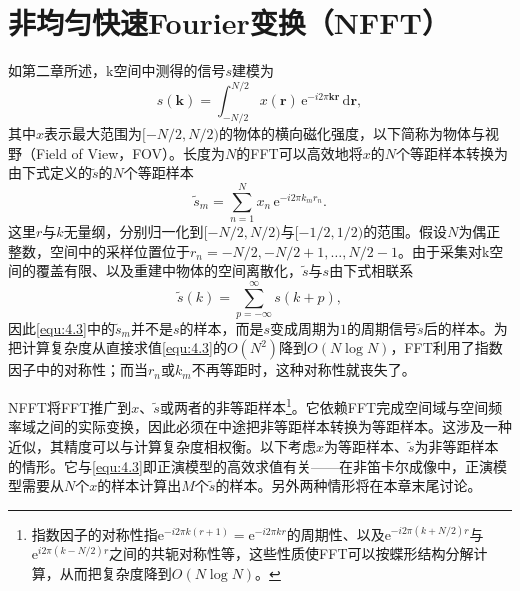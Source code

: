 \documentclass[12pt]{article}
\let\originallautoref\autoref
\renewcommand{\autoref}[1]{\allowbreak\originallautoref{#1}}
\begin{document}
\section{非均匀快速Fourier变换（NFFT）}
如第二章所述，k空间中测得的信号$s$建模为
\begin{equation}
    s(\bm{k})=\int_{-N/2}^{N/2}x(\bm{r})\,\mathrm{e}^{-i2\pi\bm{k}\bm{r}}\,\mathrm{d}\bm{r},
    \label{equ:4.2}
\end{equation}
其中$x$表示最大范围为$[-N/2,N/2)$的物体的横向磁化强度，以下简称为物体与视野（Field of View，FOV）\label{term:FOV}。长度为$N$的FFT可以高效地将$x$的$N$个等距样本转换为由下式定义的$\tilde{s}$的$N$个等距样本
\begin{equation}
    \tilde{s}_m=\sum_{n=1}^{N}x_n\,\mathrm{e}^{-i2\pi k_m r_n}.
    \label{equ:4.3}
\end{equation}
这里$r$与$k$无量纲，分别归一化到$[-N/2,N/2)$与$[-1/2,1/2)$的范围。假设$N$为偶正整数，空间中的采样位置位于$r_n=-N/2,-N/2+1,\ldots,N/2-1$。由于采集对k空间的覆盖有限、以及重建中物体的空间离散化，$\tilde{s}$与$s$由下式相联系
\begin{equation}
    \tilde{s}(k)=\sum_{p=-\infty}^{\infty}s(k+p),
    \label{equ:4.4}
\end{equation}
因此\autoref{equ:4.3}中的$\tilde{s}_m$并不是$s$的样本，而是$s$变成周期为$1$的周期信号$\tilde{s}$后的样本。为把计算复杂度从直接求值\autoref{equ:4.3}的$O(N^2)$降到$O(N\log N)$，FFT利用了指数因子中的对称性；而当$r_n$或$k_m$不再等距时，这种对称性就丧失了。

NFFT将FFT推广到$x$、$\tilde{s}$或两者的非等距样本\footnote{指数因子的对称性指$\mathrm{e}^{-i2\pi k(r+1)}=\mathrm{e}^{-i2\pi kr}$的周期性、以及$\mathrm{e}^{-i2\pi(k+N/2)r}$与$\mathrm{e}^{i2\pi(k-N/2)r}$之间的共轭对称性等，这些性质使FFT可以按蝶形结构分解计算，从而把复杂度降到$O(N\log N)$。}。它依赖FFT完成空间域与空间频率域之间的实际变换，因此必须在中途把非等距样本转换为等距样本。这涉及一种近似，其精度可以与计算复杂度相权衡。以下考虑$x$为等距样本、$\tilde{s}$为非等距样本的情形。它与\autoref{equ:4.3}即正演模型的高效求值有关——在非笛卡尔成像中，正演模型需要从$N$个$x$的样本计算出$M$个$\tilde{s}$的样本。另外两种情形将在本章末尾讨论。
\end{document}

